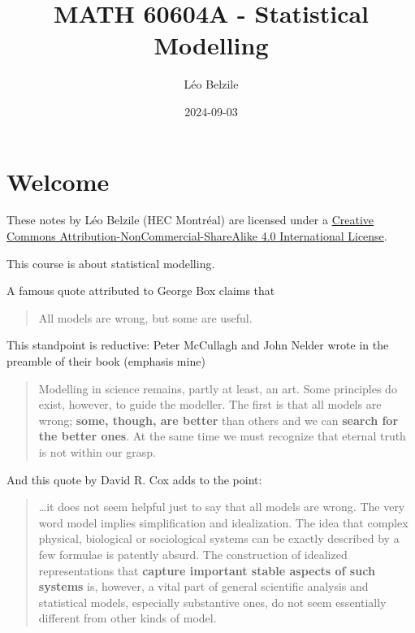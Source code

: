 \documentclass[
  11pt,
  letterpaper,
]{scrbook}
\title{MATH 60604A - Statistical Modelling}
\author{Léo Belzile}
\date{2024-09-03}
\renewcommand*\contentsname{Table of contents}
\newcommand\contentsname{Table of contents}
\theoremstyle{plain}
\theoremstyle{definition}
\theoremstyle{definition}
\theoremstyle{remark}
\begin{document}


\renewcommand*\contentsname{Table of contents}
{
\setcounter{tocdepth}{2}
\tableofcontents
}

\mainmatter
{}

\chapter*{Welcome}\label{welcome}


These notes by Léo Belzile (HEC Montréal) are licensed under a
\href{http://creativecommons.org/licenses/by-nc-sa/4.0/}{Creative
Commons Attribution-NonCommercial-ShareAlike 4.0 International License}.

This course is about statistical modelling.

A famous quote attributed to George Box claims that

\begin{quote}
All models are wrong, but some are useful.
\end{quote}

This standpoint is reductive: Peter McCullagh and John Nelder wrote in
the preamble of their book (emphasis mine)

\begin{quote}
Modelling in science remains, partly at least, an art. Some principles
do exist, however, to guide the modeller. The first is that all models
are wrong; \textbf{some, though, are better} than others and we can
\textbf{search for the better ones}. At the same time we must recognize
that eternal truth is not within our grasp.
\end{quote}

And this quote by David R. Cox adds to the point:

\begin{quote}
\ldots it does not seem helpful just to say that all models are wrong.
The very word model implies simplification and idealization. The idea
that complex physical, biological or sociological systems can be exactly
described by a few formulae is patently absurd. The construction of
idealized representations that \textbf{capture important stable aspects
of such systems} is, however, a vital part of general scientific
analysis and statistical models, especially substantive ones, do not
seem essentially different from other kinds of model.
\end{quote}
\end{document}
